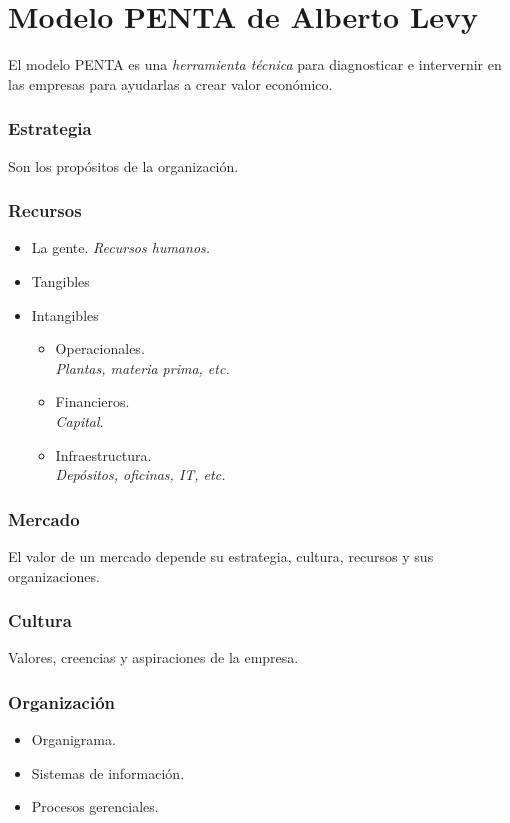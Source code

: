 \documentclass[12pt, spanish, a5paper]{article}
\begin{document}
\part{Modelo PENTA de Alberto Levy}

El modelo PENTA es una \emph{herramienta técnica} para diagnosticar e intervernir en las empresas para ayudarlas a crear valor económico.

\section{Estrategia}
Son los propósitos de la organización.

\section{Recursos}

\begin{itemize}
	\item La gente. \textit{Recursos humanos.}
	\item Tangibles
	\item Intangibles
		\begin{itemize}
			\item Operacionales.\\
			\textit{Plantas, materia prima, etc.}
			\item Financieros.\\
			\textit{Capital}.
			\item Infraestructura. \\
			\textit{Depósitos, oficinas, IT, etc.}
		\end{itemize}
\end{itemize}

\section{Mercado}

El valor de un mercado depende su estrategia, cultura, recursos y sus organizaciones.

\section{Cultura}
Valores, creencias y aspiraciones de la empresa.

\section{Organización}
\begin{itemize}
	\item Organigrama.
	\item Sistemas de información.
	\item Procesos gerenciales.
\end{itemize}
\end{document}
